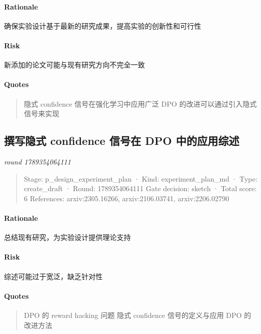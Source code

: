 \documentclass{article}
\begin{document}
\paragraph{Rationale}

确保实验设计基于最新的研究成果，提高实验的创新性和可行性

\paragraph{Risk}

新添加的论文可能与现有研究方向不完全一致

\paragraph{Quotes}
\begin{quote}
隐式 confidence 信号在强化学习中应用广泛
DPO 的改进可以通过引入隐式信号来实现
\end{quote}

\subsection{撰写隐式 confidence 信号在 DPO 中的应用综述}
\textit{round 1789354064111}\\
\begin{quote}
Stage: p\_design\_experiment\_plan  ·  Kind: experiment\_plan\_md  ·  Type: create\_draft  ·  Round: 1789354064111
Gate decision: sketch  ·  Total score: 6
References: arxiv:2305.16266, arxiv:2106.03741, arxiv:2206.02790
\end{quote}

\paragraph{Rationale}

总结现有研究，为实验设计提供理论支持

\paragraph{Risk}

综述可能过于宽泛，缺乏针对性

\paragraph{Quotes}
\begin{quote}
DPO 的 reward hacking 问题
隐式 confidence 信号的定义与应用
DPO 的改进方法
\end{quote}
\end{document}
